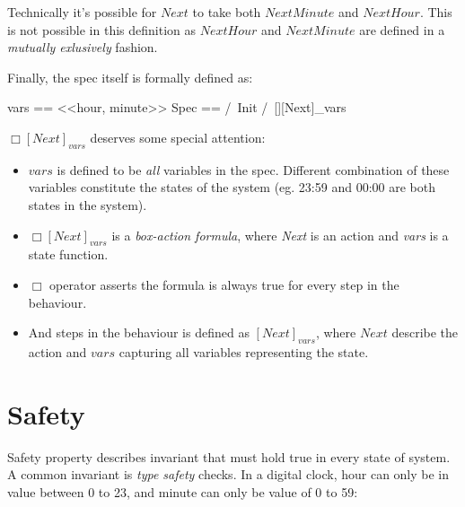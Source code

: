 \documentclass{report}
\begin{document}
Technically it's possible for $Next$ to take both $NextMinute$ and $NextHour$.
This is not possible in this definition as $NextHour$ and $NextMinute$ are
defined in a \textit{mutually exlusively} fashion.\newline

Finally, the spec itself is formally defined as:\newline
\begin{tla}
    vars == <<hour, minute>>
    Spec ==
        /\ Init
        /\ [][Next]_vars
\end{tla}
\begin{tlatex}
%
%
%
%
\end{tlatex}
\newline

$\Box[Next]_{vars}$ deserves some special attention:
\begin{itemize}
    \item $vars$ is defined to be \textit{all} variables in the spec. Different
    combination of these variables constitute the states of the system (eg.
    23:59 and 00:00 are both states in the system).
    \item $\Box[Next]_{vars}$ is a \textit{box-action formula}, where
    \textit{Next} is an action and \textit{vars} is a state function.
    \item $\Box$ operator asserts the formula is always true for every step in the behaviour.
    \item And steps in the behaviour is defined as $[Next]_{vars}$, where $Next$
    describe the action and $vars$ capturing all variables representing the state.
\end{itemize}


\section{Safety}

Safety property describes invariant that must hold true in every state of
system. A common invariant is \textit{type safety} checks. In a digital clock, 
hour can only be in value between 0 to 23, and minute can only be value of 0 to 59:\newline
\end{document}
